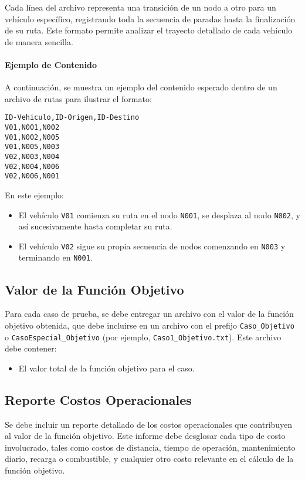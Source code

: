 \documentclass[12pt]{article}
\begin{document}
Cada línea del archivo representa una transición de un nodo a otro para un vehículo específico, registrando toda la secuencia de paradas hasta la finalización de su ruta. Este formato permite analizar el trayecto detallado de cada vehículo de manera sencilla.

\paragraph{Ejemplo de Contenido}
A continuación, se muestra un ejemplo del contenido esperado dentro de un archivo de rutas para ilustrar el formato:
\begin{verbatim}
ID-Vehiculo,ID-Origen,ID-Destino
V01,N001,N002
V01,N002,N005
V01,N005,N003
V02,N003,N004
V02,N004,N006
V02,N006,N001
\end{verbatim}

En este ejemplo:
\begin{itemize}
    \item El vehículo \texttt{V01} comienza su ruta en el nodo \texttt{N001}, se desplaza al nodo \texttt{N002}, y así sucesivamente hasta completar su ruta.
    \item El vehículo \texttt{V02} sigue su propia secuencia de nodos comenzando en \texttt{N003} y terminando en \texttt{N001}.
\end{itemize}

\subsection{Valor de la Función Objetivo}
Para cada caso de prueba, se debe entregar un archivo con el valor de la función objetivo obtenida, que debe incluirse en un archivo con el prefijo \texttt{Caso\_Objetivo} o \texttt{CasoEspecial\_Objetivo} (por ejemplo, \texttt{Caso1\_Objetivo.txt}). Este archivo debe contener:
\begin{itemize}
    \item El valor total de la función objetivo para el caso.
\end{itemize}

\subsection{Reporte Costos Operacionales}
Se debe incluir un reporte detallado de los costos operacionales que contribuyen al valor de la función objetivo. Este informe debe desglosar cada tipo de costo involucrado, tales como costos de distancia, tiempo de operación, mantenimiento diario, recarga o combustible, y cualquier otro costo relevante en el cálculo de la función objetivo.
\end{document}
